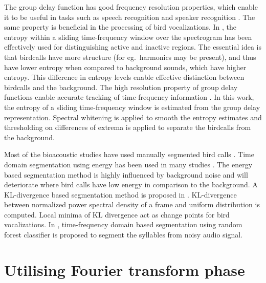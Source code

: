 \documentclass[a4paper]{article}
\begin{document}
The group delay function has good frequency resolution properties, which enable
it to be useful in tasks such as speech recognition and speaker recognition
\cite{hema} \cite{padman} \cite{modgdf}. The same property is beneficial in the processing of bird
vocalizations. In \cite{wang2013}, the entropy within a sliding time-frequency
window over the spectrogram has been effectively used for distinguishing active
and inactive regions. The essential idea is that birdcalls have more structure
(for eg.~harmonics may be present), and thus have lower entropy when compared to
 background sounds, which have higher entropy. This difference in entropy
levels enable effective distinction between birdcalls and the background.
The high resolution property of group delay functions enable accurate tracking
of time-frequency information \cite{padman}. In this work, the entropy of a sliding
time-frequency window is estimated from the group delay representation. Spectral
whitening is applied to smooth the entropy estimates and thresholding on differences of extrema is
applied to separate the birdcalls from the background.

Most of the bioacoustic studies have used manually segmented bird calls \cite{Trifa} \cite{Lee} \cite{Kaewtip}. Time domain segmentation using energy has been used in many studies \cite{Harma} \cite{Somervuo} \cite{Fagerlund} . The energy  based segmentation method is highly influenced by background noise and will deteriorate  where bird calls have low energy in comparison to the background. A KL-divergence based segmentation method   is proposed in \cite{Lakshmi}.  KL-divergence between normalized power spectral density of a frame and uniform distribution is computed. Local minima of KL divergence act as change points for bird vocalizations. In \cite{Neal} , time-frequency domain based segmentation using random forest classifier is proposed to segment the syllables from noisy audio signal. 





\section{Utilising Fourier transform phase}
\end{document}
